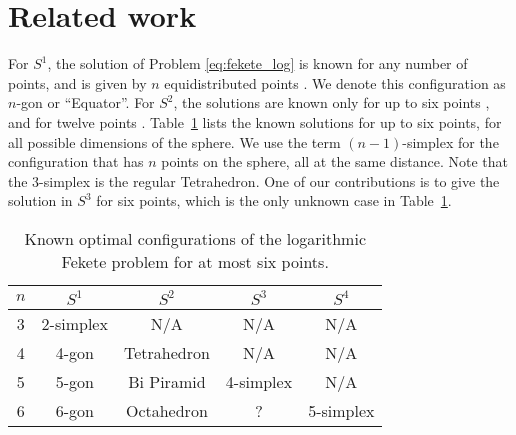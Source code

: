 \section{Related work}
For $S^1$, the solution of Problem \eqref{eq:fekete_log} is known for any number of points, and is given by $n$ equidistributed points \cite[Theorem 2.3.3]{borodachov2019}.
    We denote this configuration as $n$-gon or ``Equator''.
	For $S^2$, the solutions are known only for up to six points \cite{andreev1996, kolushov1997, dragnev2002}, and for twelve points \cite{andreev1996}.
	Table~\ref{tab:known_solutions} lists the known solutions for up to six points, for all possible dimensions of the sphere.
	We use the term $(n-1)$-simplex for the configuration that has $n$ points on the sphere, all at the same distance. Note that the 3-simplex is the regular Tetrahedron.
    One of our contributions is to give the solution in $S^3$ for six points, which is the only unknown case in Table~\ref{tab:known_solutions}.
	
	\begin{table}
    \centering
		\caption{Known optimal configurations of the logarithmic Fekete problem for at most six points.}
		\label{tab:known_solutions}
		\begin{tabular}{ccccc}
			\toprule
			$n$ & $S^1$ & $S^2$ & $S^3$ & $S^4$ \\
			\midrule
			3 & 2-simplex & N/A & N/A & N/A \\
			4 & 4-gon & Tetrahedron \cite{kolushov1997} & N/A & N/A \\
			5 & 5-gon & Bi Piramid \cite{dragnev2002} & 4-simplex \cite{kolushov1997} & N/A \\
			6 & 6-gon & Octahedron \cite{kolushov1997} & ? & 5-simplex \cite{kolushov1997} \\
			\bottomrule
		\end{tabular}
	\end{table}

